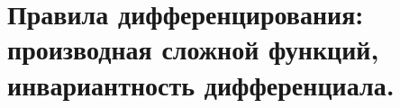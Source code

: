 \section{Правила дифференцирования: производная сложной функций, инвариантность дифференциала.}

\pagebreak